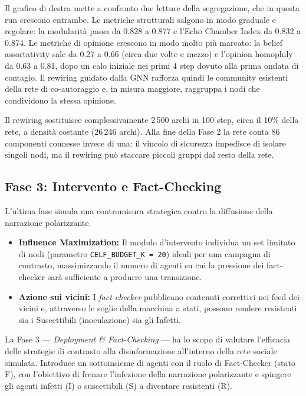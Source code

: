 \documentclass[11pt, a4paper]{article}
\begin{document}
Il grafico di destra mette a confronto due letture della segregazione, che in questa run crescono entrambe. Le metriche strutturali salgono in modo graduale e regolare: la modularità passa da 0.828 a 0.877 e l'Echo Chamber Index da 0.832 a 0.874. Le metriche di opinione crescono in modo molto più marcato: la belief assortativity sale da 0.27 a 0.66 (circa due volte e mezzo) e l'opinion homophily da 0.63 a 0.81, dopo un calo iniziale nei primi 4 step dovuto alla prima ondata di contagio. Il rewiring guidato dalla GNN rafforza quindi le community esistenti della rete di co-autoraggio e, in misura maggiore, raggruppa i nodi che condividono la stessa opinione.

Il rewiring sostituisce complessivamente 2\,500 archi in 100 step, circa il 10\% della rete, a densità costante (26\,246 archi). Alla fine della Fase 2 la rete conta 86 componenti connesse invece di una: il vincolo di sicurezza impedisce di isolare singoli nodi, ma il rewiring può staccare piccoli gruppi dal resto della rete.

\subsection{Fase 3: Intervento e Fact-Checking}
L'ultima fase simula una contromisura strategica contro la diffusione della narrazione polarizzante.
\begin{itemize}[leftmargin=*]
    \item \textbf{Influence Maximization:} Il modulo d'intervento individua un set limitato di nodi (parametro \texttt{CELF\_BUDGET\_K = 20}) ideali per una campagna di contrasto, massimizzando il numero di agenti su cui la pressione dei fact-checker sarà sufficiente a produrre una transizione.
    \item \textbf{Azione sui vicini:} I \textit{fact-checker} pubblicano contenuti correttivi nei feed dei vicini e, attraverso le soglie della macchina a stati, possono rendere resistenti sia i Suscettibili (inoculazione) sia gli Infetti.
\end{itemize}

La Fase 3 — \textit{Deployment \& Fact-Checking} — ha lo scopo di valutare l'efficacia delle strategie di contrasto alla disinformazione all'interno della rete sociale simulata. Introduce un sottoinsieme di agenti con il ruolo di Fact-Checker (stato F), con l'obiettivo di frenare l'infezione della narrazione polarizzante e spingere gli agenti infetti (I) o suscettibili (S) a diventare resistenti (R).
\end{document}
